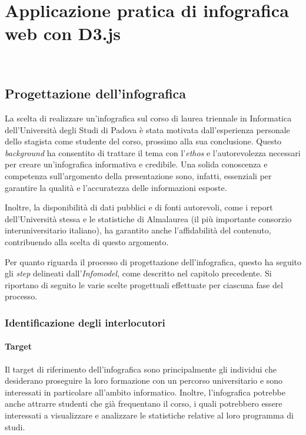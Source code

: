 \chapter{Applicazione pratica di infografica web con D3.js}
\label{cap:applicazione}
\\

\section{Progettazione dell'infografica}
La scelta di realizzare un'infografica sul corso di laurea triennale in Informatica dell'Università degli Studi di Padova è stata motivata dall'esperienza personale dello stagista come 
studente del corso, prossimo alla sua conclusione. 
Questo \emph{background} ha consentito di trattare il tema con l'\emph{ethos} e l'autorevolezza necessari per creare un'infografica informativa e credibile.
Una solida conoscenza e competenza sull'argomento della presentazione sono, infatti, essenziali per garantire la qualità e l'accuratezza delle informazioni esposte.  

Inoltre, la disponibilità di dati pubblici e di fonti autorevoli, come i report dell'Università stessa e le statistiche di Almalaurea (il più importante consorzio interuniversitario italiano), ha 
garantito anche l'affidabilità del contenuto, contribuendo alla scelta di questo argomento.

\bigskip
\noindent Per quanto riguarda il processo di progettazione dell'infografica, questo ha seguito gli \emph{step} delineati dall'\emph{Infomodel}, come descritto nel capitolo precedente. 
Si riportano di seguito le varie scelte progettuali effettuate per ciascuna fase del processo.

\subsection{Identificazione degli interlocutori}
\subsubsection{Target}
Il target di riferimento dell'infografica sono principalmente gli individui che desiderano proseguire la loro formazione con un percorso universitario e sono interessati
in particolare all'ambito informatico. 
Inoltre, l'infografica potrebbe anche attrarre studenti che già frequentano il corso, i quali potrebbero essere interessati a visualizzare e analizzare le statistiche relative al loro programma di studi. 

